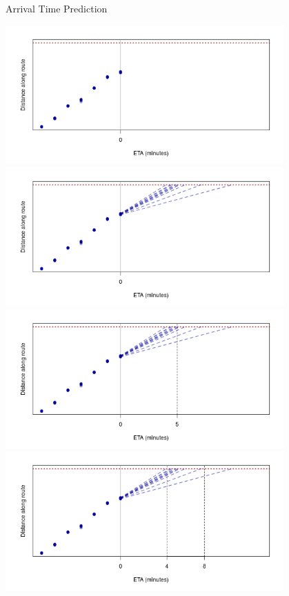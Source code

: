 \documentclass[10pt,t]{beamer}
\begin{document}
\begin{frame}{Arrival Time Prediction}
  \begin{overprint}
    \centering
    \includegraphics[width=0.8\textwidth]{arrival/particle_arrival1.png}
    \centering
    \includegraphics[width=0.8\textwidth]{arrival/particle_arrival2.png}
    \centering
    \includegraphics[width=0.8\textwidth]{arrival/particle_arrival3.png}
    \centering
    \includegraphics[width=0.8\textwidth]{arrival/particle_arrival4.png}
  \end{overprint}
\end{frame}
\end{document}
